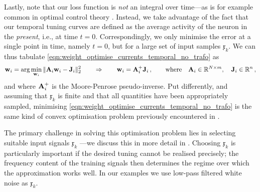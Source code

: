 Lastly, note that our loss function is \emph{not} an integral over time---as is for example common in optimal control theory \citep[e.g.,][Chapter~14]{brogan1991modern}.
Instead, we take advantage of the fact that our temporal tuning curves are defined as the average activity of the neuron in the \emph{present}, i.e., at time $t = 0$.
Correspondingly, we only minimise the error at a single point in time, namely $t = 0$, but for a large set of input samples $\mathfrak{x}_k$.
We can thus tabulate \cref{eqn:weight_optimise_currents_temporal_no_trafo} as
\begin{align*}
	\mathbf{w}_i = \arg\min_{\mathbf{w}_i} \| \mathbf{A}_i \mathbf{w}_i - \mathbf{J}_i \|_2^2 \quad\quad \Rightarrow \quad\quad \mathbf{w}_i = \mathbf{A}_i^+ \mathbf{J}_i \,, \quad\quad \text{where} \quad \mathbf{A}_i \in \mathbb{R}^{N \times m}, \quad \mathbf{J}_i \in \mathbb{R}^n \,,
\end{align*}
and where $\mathbf{A}_i^+$ is the Moore-Penrose pseudo-inverse.
Put differently, and assuming that $\mathfrak{x}_k$ is finite and that all quantities have been appropriately sampled, minimising \cref{eqn:weight_optimise_currents_temporal_no_trafo} is the same kind of convex optimisation problem previously encountered in .

The primary challenge in solving this optimisation problem lies in selecting suitable input signals $\mathfrak{x}_k$ \citep[cf.][Section~10.2.5]{verhaegen2007filtering}---we discuss this in more detail in .
Choosing $\mathfrak{x}_k$ is particularly important if the desired tuning cannot be realised precisely; the frequency content of the training signals then determines the regime over which the approximation works well.
In our examples we use low-pass filtered white noise as $\mathfrak{x}_k$.

